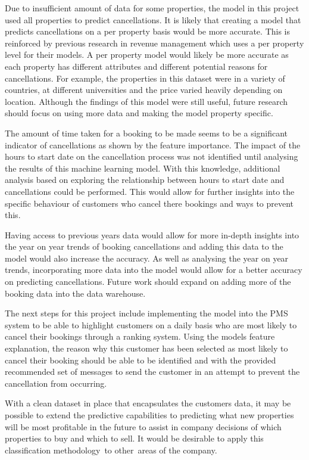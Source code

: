 \vspace{5mm}

Due to insufficient amount of data for some properties, the model in this project used all properties to predict cancellations. It is likely that creating a model that predicts cancellations on a per property basis would be more accurate. This is reinforced by previous research in revenue management which uses a per property level for their models. A per property model would likely be more accurate as each property has different attributes and different potential reasons for cancellations. For example, the properties in this dataset were in a variety of countries, at different universities and the price varied heavily depending on location. Although the findings of this model were still useful, future research should focus on using more data and making the model property specific. 

\vspace{5mm}

The amount of time taken for a booking to be made seems to be a significant indicator of cancellations as shown by the feature importance. The impact of the hours to start date on the cancellation process was not identified until analysing the results of this machine learning model. With this knowledge, additional analysis based on exploring the relationship between hours to start date and cancellations could be performed. This would allow for further insights into the specific behaviour of customers who cancel there bookings and ways to prevent this. 

\vspace{5mm}

Having access to previous years data would allow for more in-depth insights into the year on year trends of booking cancellations and adding this data to the model would also increase the accuracy.  As well as analysing the year on year trends, incorporating more data into the model would allow for a better accuracy on predicting cancellations. Future work should expand on adding more of the booking data into the data warehouse. 

\vspace{5mm}

The next steps for this project include implementing the model into the PMS system to be able to highlight customers on a daily basis who are most likely to cancel their bookings through a ranking system. Using the models feature explanation, the reason why this customer has been selected as most likely to cancel their booking should be able to be identified and with the provided recommended set of messages to send the customer in an attempt to prevent the cancellation from occurring.

\vspace{5mm}

With a clean dataset in place that encapsulates the customers data, it may be possible to extend the predictive capabilities to predicting what new properties will be most profitable in the future to assist in company decisions of which properties to buy and which to sell. It would be desirable to apply this classification methodology to other areas of the company.



